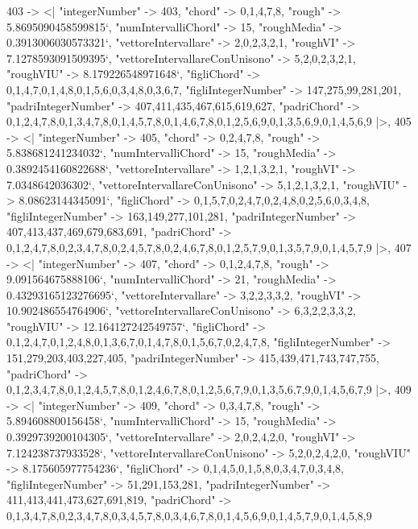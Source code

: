 \documentclass[
]{article}
\begin{document}
\begin{DatasetVerbatim}
  403 -> <|
    "integerNumber" -> 403,
    "chord" -> {0,1,4,7,8},
    "rough" -> 5.8695090458599815`,
    "numIntervalliChord" -> 15,
    "roughMedia" -> 0.3913006030573321`,
    "vettoreIntervallare" -> {2,0,2,3,2,1},
    "roughVI" -> 7.1278593091509395`,
    "vettoreIntervallareConUnisono" -> {5,2,0,2,3,2,1},
    "roughVIU" -> 8.179226548971648`,
    "figliChord" -> {{0,1,4,7},{0,1,4,8},{0,1,5,6},{0,3,4,8},{0,3,6,7}},
    "figliIntegerNumber" -> {147,275,99,281,201},
    "padriIntegerNumber" -> {407,411,435,467,615,619,627},
    "padriChord" -> {{0,1,2,4,7,8},{0,1,3,4,7,8},{0,1,4,5,7,8},{0,1,4,6,7,8},{0,1,2,5,6,9},{0,1,3,5,6,9},{0,1,4,5,6,9}}
  |>,
  405 -> <|
    "integerNumber" -> 405,
    "chord" -> {0,2,4,7,8},
    "rough" -> 5.838681241234032`,
    "numIntervalliChord" -> 15,
    "roughMedia" -> 0.3892454160822688`,
    "vettoreIntervallare" -> {1,2,1,3,2,1},
    "roughVI" -> 7.0348642036302`,
    "vettoreIntervallareConUnisono" -> {5,1,2,1,3,2,1},
    "roughVIU" -> 8.08623144345091`,
    "figliChord" -> {{0,1,5,7},{0,2,4,7},{0,2,4,8},{0,2,5,6},{0,3,4,8}},
    "figliIntegerNumber" -> {163,149,277,101,281},
    "padriIntegerNumber" -> {407,413,437,469,679,683,691},
    "padriChord" -> {{0,1,2,4,7,8},{0,2,3,4,7,8},{0,2,4,5,7,8},{0,2,4,6,7,8},{0,1,2,5,7,9},{0,1,3,5,7,9},{0,1,4,5,7,9}}
  |>,
  407 -> <|
    "integerNumber" -> 407,
    "chord" -> {0,1,2,4,7,8},
    "rough" -> 9.091564675888106`,
    "numIntervalliChord" -> 21,
    "roughMedia" -> 0.43293165123276695`,
    "vettoreIntervallare" -> {3,2,2,3,3,2},
    "roughVI" -> 10.902486554764906`,
    "vettoreIntervallareConUnisono" -> {6,3,2,2,3,3,2},
    "roughVIU" -> 12.164127242549757`,
    "figliChord" -> {{0,1,2,4,7},{0,1,2,4,8},{0,1,3,6,7},{0,1,4,7,8},{0,1,5,6,7},{0,2,4,7,8}},
    "figliIntegerNumber" -> {151,279,203,403,227,405},
    "padriIntegerNumber" -> {415,439,471,743,747,755},
    "padriChord" -> {{0,1,2,3,4,7,8},{0,1,2,4,5,7,8},{0,1,2,4,6,7,8},{0,1,2,5,6,7,9},{0,1,3,5,6,7,9},{0,1,4,5,6,7,9}}
  |>,
  409 -> <|
    "integerNumber" -> 409,
    "chord" -> {0,3,4,7,8},
    "rough" -> 5.894608800156458`,
    "numIntervalliChord" -> 15,
    "roughMedia" -> 0.3929739200104305`,
    "vettoreIntervallare" -> {2,0,2,4,2,0},
    "roughVI" -> 7.124238737933528`,
    "vettoreIntervallareConUnisono" -> {5,2,0,2,4,2,0},
    "roughVIU" -> 8.175605977754236`,
    "figliChord" -> {{0,1,4,5},{0,1,5,8},{0,3,4,7},{0,3,4,8}},
    "figliIntegerNumber" -> {51,291,153,281},
    "padriIntegerNumber" -> {411,413,441,473,627,691,819},
    "padriChord" -> {{0,1,3,4,7,8},{0,2,3,4,7,8},{0,3,4,5,7,8},{0,3,4,6,7,8},{0,1,4,5,6,9},{0,1,4,5,7,9},{0,1,4,5,8,9}}

\end{DatasetVerbatim}
\end{document}
